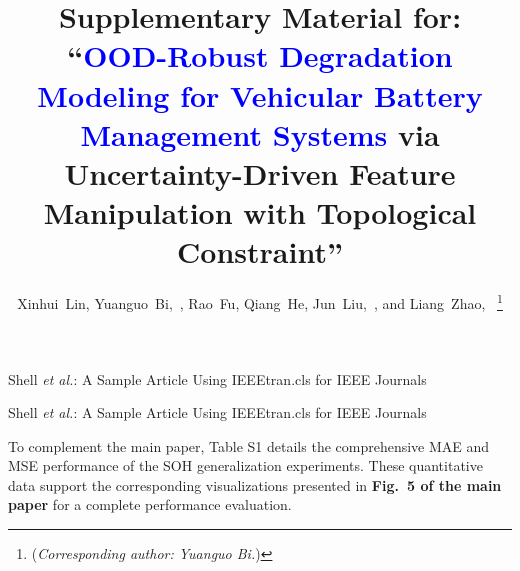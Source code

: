\documentclass[lettersize,onecolumn]{IEEEtran}
\newcommand{\rev}[1]{\textcolor{blue}{#1}}
\begin{document}
\title{Supplementary Material for: ``\rev{OOD-Robust Degradation Modeling for Vehicular Battery Management Systems} via Uncertainty-Driven Feature Manipulation with Topological Constraint''}

\markboth{}%
{Shell \MakeLowercase{\textit{et al.}}: A Sample Article Using IEEEtran.cls for IEEE Journals}

\author{
    Xinhui~Lin,
    Yuanguo~Bi,~,
    Rao~Fu,
    Qiang~He,
    Jun~Liu,~,
    and Liang~Zhao,~
    \vspace{-1.5em}
\thanks{(\emph{Corresponding author: Yuanguo Bi.})}
}

%
{Shell \MakeLowercase{\textit{et al.}}: A Sample Article Using IEEEtran.cls for IEEE Journals}

\maketitle

To complement the main paper, Table S1 details the comprehensive MAE and MSE performance of the SOH generalization experiments. These quantitative data support the corresponding visualizations presented in \textbf{Fig.~5 of the main paper} for a complete performance evaluation.
\end{document}
